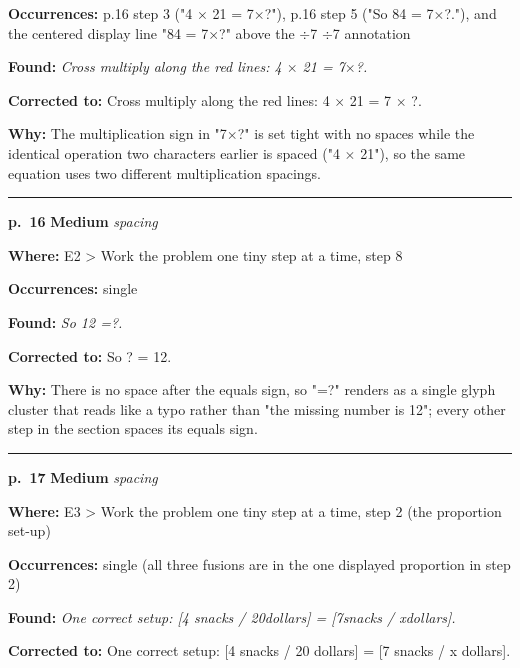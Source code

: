 \documentclass[11pt]{article}
\newcommand{\sevmed}[1]{\textcolor{orange!80!black}{\textbf{#1}}}
\begin{document}
\noindent\textbf{Occurrences: }p.16 step 3 ("4 $\times$ 21 = 7$\times$?"), p.16 step 5 ("So 84 = 7$\times$?."), and the centered display line "84 = 7$\times$?" above the $\div$7 $\div$7 annotation\par
\noindent\textbf{Found: }\textit{Cross multiply along the red lines: 4 $\times$ 21 = 7$\times$?.}\par
\noindent\textbf{Corrected to: }Cross multiply along the red lines: 4 $\times$ 21 = 7 $\times$ ?.\par
\noindent\textbf{Why: }The multiplication sign in "7$\times$?" is set tight with no spaces while the identical operation two characters earlier is spaced ("4 $\times$ 21"), so the same equation uses two different multiplication spacings.\par\vspace{4pt}
\noindent\rule{\textwidth}{0.4pt}\par\nobreak\vspace{2pt}
\noindent\textbf{p.~16} \quad \sevmed{Medium} \quad \textit{spacing}\par
\noindent\textbf{Where: }E2 > Work the problem one tiny step at a time, step 8\par
\noindent\textbf{Occurrences: }single\par
\noindent\textbf{Found: }\textit{So 12 =?.}\par
\noindent\textbf{Corrected to: }So ? = 12.\par
\noindent\textbf{Why: }There is no space after the equals sign, so "=?" renders as a single glyph cluster that reads like a typo rather than "the missing number is 12"; every other step in the section spaces its equals sign.\par\vspace{4pt}
\noindent\rule{\textwidth}{0.4pt}\par\nobreak\vspace{2pt}
\noindent\textbf{p.~17} \quad \sevmed{Medium} \quad \textit{spacing}\par
\noindent\textbf{Where: }E3 > Work the problem one tiny step at a time, step 2 (the proportion set-up)\par
\noindent\textbf{Occurrences: }single (all three fusions are in the one displayed proportion in step 2)\par
\noindent\textbf{Found: }\textit{One correct setup: [4 snacks / 20dollars] = [7snacks / xdollars].}\par
\noindent\textbf{Corrected to: }One correct setup: [4 snacks / 20 dollars] = [7 snacks / x dollars].\par
\end{document}
